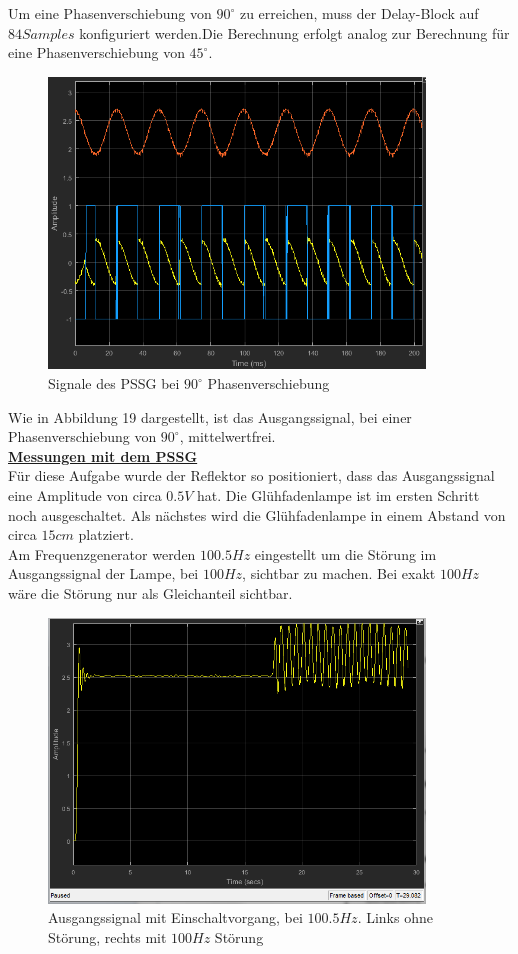\documentclass[a4paper,12pt]{article}
\begin{document}
	\noindent
	Um eine Phasenverschiebung von $90^{\circ}$ zu erreichen, muss der Delay-Block auf $84 Samples$ konfiguriert werden.\newline Die Berechnung erfolgt analog zur Berechnung für eine Phasenverschiebung von $45^{\circ}$.
	\begin{figure}[H]
		\centering
		\includegraphics[width=10cm]{assets/pssg-phase90}
		\caption{Signale des PSSG bei $90^{\circ}$ Phasenverschiebung}
	\end{figure}
	\noindent
	Wie in Abbildung 19 dargestellt, ist das Ausgangssignal, bei einer Phasenverschiebung von $90^{\circ}$, mittelwertfrei.\\ \newline
	\underline{\textbf{Messungen mit dem PSSG}} \\ \newline
	\noindent
	Für diese Aufgabe wurde der Reflektor so positioniert, dass das Ausgangssignal eine Amplitude von circa $0.5V$ hat. Die Glühfadenlampe ist im ersten Schritt noch ausgeschaltet. \newline
	Als nächstes wird die Glühfadenlampe in einem Abstand von circa $15cm$ platziert.\\ \newline
	Am Frequenzgenerator werden $100.5Hz$ eingestellt um die Störung im Ausgangssignal der Lampe, bei $100Hz$, sichtbar zu machen.\newline
	Bei exakt $100Hz$ wäre die Störung nur als Gleichanteil sichtbar.
	\begin{figure}[H]
		\centering
		\includegraphics[width=10cm]{assets/pssg-100_5Hz}
		\caption{Ausgangssignal mit Einschaltvorgang, bei $100.5Hz$. Links ohne Störung, rechts mit $100Hz$ Störung}
	\end{figure}
\end{document}
